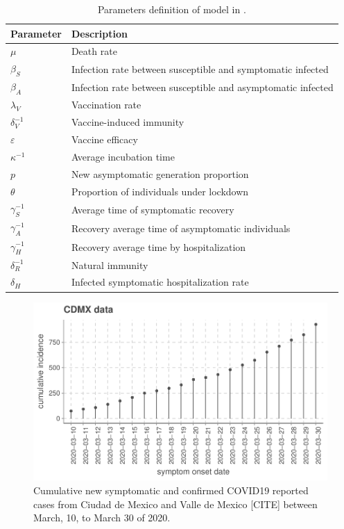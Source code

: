 \begin{table}[h!]
	\centering
	\begin{tabular}{>{\centering}%
        p{}%
        p{}
    }
		\toprule
		\textbf{Parameter} & \textbf{Description}
  	\\
  	\midrule
		$\mu$ &
			Death rate
		\\
        $\beta_S$ &
        	Infection rate between susceptible and symptomatic infected
		\\
        $\beta_A$ &
        	Infection rate between susceptible and asymptomatic infected
		\\
        $\lambda_V$ &
        	Vaccination rate
		\\
        $\delta_{V}^{-1}$ &
        Vaccine-induced immunity
		\\
        $\varepsilon$ &
        	Vaccine efficacy
		\\
        $\kappa^{-1}$ &
        	Average incubation time
        \\
		$p$ &
			New asymptomatic generation proportion
		\\
	    $\theta$ &
        	Proportion of individuals under lockdown
        \\
        $\gamma_{S}^{-1}$ &
        	Average time of symptomatic recovery
        \\
		$\gamma_{A}^{-1}$ &
			Recovery average time of asymptomatic individuals
		\\
		$\gamma_{H}^{-1}$ &
			Recovery average time by hospitalization
		\\
        $\delta_{R}^{-1}$ &
        	Natural immunity
  		\\
  		$\delta_{H}$ &
        	Infected symptomatic hospitalization rate
  		\\
  	\bottomrule
	\end{tabular}
		\caption{
			Parameters definition of model in
			.}
    \label{tbl:dynamics_base_parameters}
\end{table}
%
\begin{figure}[htb]
    \centering
    \includegraphics[scale=0.8, keepaspectratio]{Figures/cdmx_input_data}
    \caption{%
        Cumulative new symptomatic and confirmed COVID19 reported cases from
        Ciudad de Mexico and Valle de Mexico
        [CITE] between March, 10, to March 30 of
        2020.
    }
    \label{fig:data_CDMX}
\end{figure}
%

